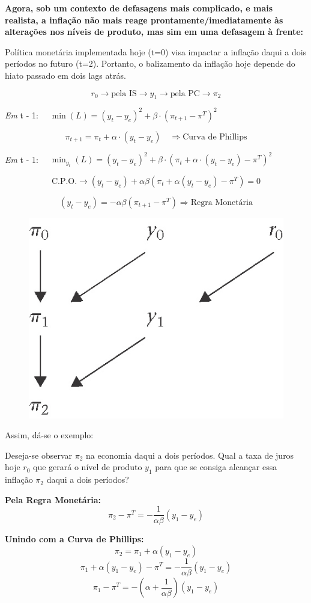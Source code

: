 \documentclass[a4paper,12pt]{article}[abntex2]
\begin{document}
\textbf{Agora, sob um contexto de defasagens mais complicado, e mais realista, a inflação não mais reage prontamente/imediatamente às alterações nos níveis de produto, mas sim em uma defasagem à frente:}

Política monetária implementada hoje (t=0) visa impactar a inflação daqui a dois períodos no futuro (t=2). Portanto, o balizamento da inflação hoje depende do hiato passado em dois lags atrás.

\[
r_0 \rightarrow \text{pela IS} \rightarrow y_1 \rightarrow \text{pela PC} \rightarrow \pi_2
\]

\textit{Em } t - 1: \(\quad \min(L) = (y_t - y_e)^2 + \beta \cdot (\pi_{t+1} - \pi^T)^2\)

\[
\pi_{t+1} = \pi_t + \alpha \cdot (y_t - y_e) \quad \Rightarrow \text{Curva de Phillips}
\]

\textit{Em } t - 1: \(\quad \min_{y_t} (L) = (y_t - y_e)^2 + \beta \cdot (\pi_t + \alpha \cdot (y_t - y_e) - \pi^T)^2\)

\[
\text{C.P.O.} \rightarrow (y_t - y_e) + \alpha \beta (\pi_t + \alpha (y_t - y_e) - \pi^T) = 0
\]

\[
(y_t - y_e) = - \alpha \beta (\pi_{t+1} - \pi^T) \Rightarrow \text{Regra Monetária}
\]

\begin{figure}[H]
    \centering
    \includegraphics[width=0.5\linewidth]{Imagens/a16i1.png}
\end{figure}

Assim, dá-se o exemplo:

Deseja-se observar \( \pi_2 \) na economia daqui a dois períodos. Qual a taxa de juros hoje \( r_0 \) que gerará o nível de produto \( y_1 \) para que se consiga alcançar essa inflação \( \pi_2 \) daqui a dois períodos?

\textbf{Pela Regra Monetária:}
\[
\pi_2 - \pi^T = -\frac{1}{\alpha \beta} (y_1 - y_e)
\]

\textbf{Unindo com a Curva de Phillips:}
\[
\pi_2 = \pi_1 + \alpha (y_1 - y_e)
\]
\[
\pi_1 + \alpha (y_1 - y_e) - \pi^T = -\frac{1}{\alpha \beta} (y_1 - y_e)
\]
\[
\pi_1 - \pi^T = -\left( \alpha + \frac{1}{\alpha \beta} \right) (y_1 - y_e)
\]
\end{document}

